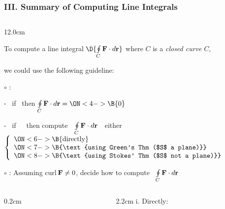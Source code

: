 \begin{frame}
\frametitle{III. Summary of Computing Line Integrals}
\scriptsize
\begin{columns}
\begin{column}{12.0cm}

To compute a line integral \quad $\D{\oint \limits_{C} {\bf F} \cdot d{\bf r}}$ \quad where $C$ is a {\em closed curve} $C$, 

\vspace{0.4cm}

we could use the following guideline:

\vspace{0.4cm}

$\circ$ : \quad 
{}

\vspace{0.2cm}

\hspace{0.8cm} - \, if \, 
 \quad then \quad $\oint \limits_{C} {\bf F} \cdot d{\bf r} = 
\ON<4->{\B{0}}$

\vspace{0.2cm}

\hspace{0.8cm} - \, if \, 
 \,\, then compute \,\, $\oint \limits_{C} {\bf F} \cdot d{\bf r}$ \,\, either \,
$\left\{
\begin{array}{l}
	\ON<6->{\B{\text{directly}}}\\
	\ON<7->{\B{\text{using Green's Thm ($S$ a plane)}}}\\
	\ON<8->{\B{\text{using Stokes' Thm ($S$ not a plane)}}}
\end{array}
\right.$

\vspace{0.6cm}

$\circ$ : Assuming curl\,{${\bf F} \ne 0$}, decide how to compute \, $\oint \limits_{C} {\bf F} \cdot d{\bf r}$

\begin{columns}
\begin{column}{0.2cm}
\end{column}
\begin{column}{2.2cm}
	i. Directly:
	

\end{column}
\end{columns}
\end{column}
\end{columns}
\end{frame}
